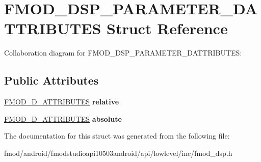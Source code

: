 \hypertarget{struct_f_m_o_d___d_s_p___p_a_r_a_m_e_t_e_r__3_d_a_t_t_r_i_b_u_t_e_s}{\section{F\+M\+O\+D\+\_\+\+D\+S\+P\+\_\+\+P\+A\+R\+A\+M\+E\+T\+E\+R\+\_\+D\+A\+T\+T\+R\+I\+B\+U\+T\+E\+S Struct Reference}
\label{struct_f_m_o_d___d_s_p___p_a_r_a_m_e_t_e_r__3_d_a_t_t_r_i_b_u_t_e_s}
}


Collaboration diagram for F\+M\+O\+D\+\_\+\+D\+S\+P\+\_\+\+P\+A\+R\+A\+M\+E\+T\+E\+R\+\_\+D\+A\+T\+T\+R\+I\+B\+U\+T\+E\+S\+:
\subsection*{Public Attributes}
\begin{DoxyCompactItemize}
\item 
\hypertarget{struct_f_m_o_d___d_s_p___p_a_r_a_m_e_t_e_r__3_d_a_t_t_r_i_b_u_t_e_s_ab96602490f518d16e671432a1106b7ac}{\hyperlink{struct_f_m_o_d__3_d___a_t_t_r_i_b_u_t_e_s}{F\+M\+O\+D\+\_\+D\+\_\+\+A\+T\+T\+R\+I\+B\+U\+T\+E\+S} {\bfseries relative}}\label{struct_f_m_o_d___d_s_p___p_a_r_a_m_e_t_e_r__3_d_a_t_t_r_i_b_u_t_e_s_ab96602490f518d16e671432a1106b7ac}

\item 
\hypertarget{struct_f_m_o_d___d_s_p___p_a_r_a_m_e_t_e_r__3_d_a_t_t_r_i_b_u_t_e_s_aadffc13359d7bcfd558f1f4337b110fe}{\hyperlink{struct_f_m_o_d__3_d___a_t_t_r_i_b_u_t_e_s}{F\+M\+O\+D\+\_\+D\+\_\+\+A\+T\+T\+R\+I\+B\+U\+T\+E\+S} {\bfseries absolute}}\label{struct_f_m_o_d___d_s_p___p_a_r_a_m_e_t_e_r__3_d_a_t_t_r_i_b_u_t_e_s_aadffc13359d7bcfd558f1f4337b110fe}

\end{DoxyCompactItemize}


The documentation for this struct was generated from the following file\+:\begin{DoxyCompactItemize}
\item 
fmod/android/fmodstudioapi10503android/api/lowlevel/inc/fmod\+\_\+dsp.\+h\end{DoxyCompactItemize}
